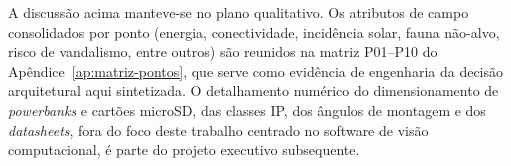A discussão acima manteve-se no plano qualitativo. Os atributos de campo consolidados por ponto (energia, conectividade, incidência solar, fauna não-alvo, risco de vandalismo, entre outros) são reunidos na matriz P01--P10 do Apêndice~\ref{ap:matriz-pontos}, que serve como evidência de engenharia da decisão arquitetural aqui sintetizada. O detalhamento numérico do dimensionamento de \emph{powerbanks} e cartões microSD, das classes IP, dos ângulos de montagem e dos \emph{datasheets}, fora do foco deste trabalho centrado no software de visão computacional, é parte do projeto executivo subsequente.
